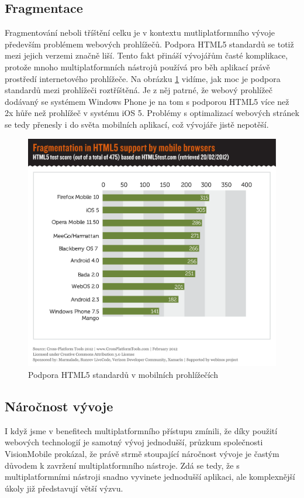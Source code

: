 \subsection{Fragmentace}
Fragmentování neboli tříštění celku je v kontextu mutliplatformního vývoje především problémem webových prohlížečů. Podpora HTML5 standardů se totiž mezi jejich verzemi značně liší. Tento fakt přináší vývojářům časté komplikace, protože mnoho multiplatformních nástrojů používá pro běh aplikací právě prostředí internetového prohlížeče. Na obrázku \ref{fig:HTML5mobilniprohlizece} vidíme, jak moc je podpora standardů mezi prohlížeči roztříštěná. Je z něj patrné, že webový prohlížeč dodávaný se systémem Windows Phone je na tom s podporou HTML5 více než 2x hůře než prohlížeč v systému iOS 5. Problémy s optimalizací webových stránek se tedy přenesly i do světa mobilních aplikací, což vývojáře jistě nepotěší.

\begin{figure}\centering
\includegraphics[width=1.0\textwidth]{html5browser.png}
\caption{Podpora HTML5 standardů v mobilních prohlížečích \cite{visionmobile_survey}}
\label{fig:HTML5mobilniprohlizece}
\end{figure}

\subsection{Náročnost vývoje}
I když jsme v benefitech multiplatformního přístupu zmínili, že díky použití webových technologií je samotný vývoj jednodušší, průzkum společnosti VisionMobile \cite{visionmobile_survey} prokázal, že právě strmě stoupající náročnost vývoje je častým důvodem k zavržení multiplatformního nástroje. Zdá se tedy, že s multiplatformními nástroji snadno vyvinete jednodušší aplikaci, ale komplexnější úkoly již představují větší výzvu.

